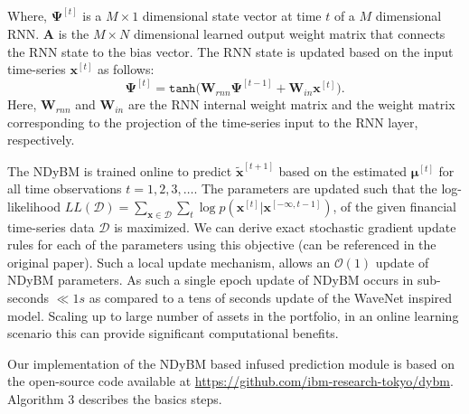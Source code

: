 \documentclass{article}
\begin{document}
Where, $\mathbf{\Psi}^{[t]}$ is a $M \times 1$ dimensional state vector at time $t$ of a $M$ dimensional RNN. $\mathbf{A}$ is the $M \times N$ dimensional learned output weight matrix that connects the RNN state to the bias vector. The RNN state is updated based on the input time-series $\mathbf{x}^{[t]}$ as follows: 
\begin{equation*}
    \mathbf{\Psi}^{[t]} = \mathtt{tanh}\Big (\mathbf{W}_{rnn}\mathbf{\Psi}^{[t-1]} + \mathbf{W}_{in}\mathbf{x}^{[t]} \Big ).
\end{equation*}
Here, $\mathbf{W}_{rnn}$ and $\mathbf{W}_{in}$ are the RNN internal weight matrix and the weight matrix corresponding to the projection of the time-series input to the RNN layer, respectively. 

The NDyBM is trained online to predict $\mathbf{\tilde{x}}^{[t+1]}$ based on the estimated $\mathbf{\mu}^{[t]}$ for all time observations $t=1,2,3, \dots$. The parameters are updated such that the log-likelihood $LL(\mathcal{D}) = \sum_{\mathbf{x}\in \mathcal{D}} \sum_{t} \log p(\mathbf{x}^{[t]}|\mathbf{x}^{[-\infty, t-1]})$, of the given financial time-series data $\mathcal{D}$ is maximized. We can derive exact stochastic gradient update rules for each of the parameters using this objective (can be referenced in the original paper). Such a local update mechanism, allows an $\mathcal{O}(1)$ update of NDyBM parameters. As such a single epoch update of NDyBM occurs in sub-seconds $\ll 1s$ as compared to a tens of seconds update of the WaveNet inspired model. Scaling up to large number of assets in the portfolio, in an online learning scenario this can provide significant computational benefits. 

Our implementation of the NDyBM based infused prediction module is based on the open-source code available at \url{https://github.com/ibm-research-tokyo/dybm}. Algorithm 3 describes the basics steps.
\end{document}
